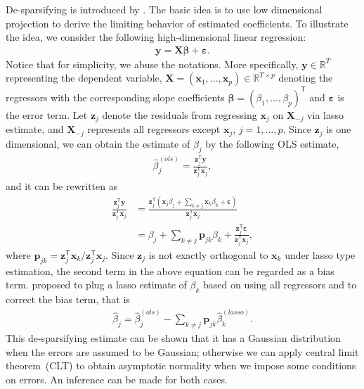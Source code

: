 \documentclass[11pt,a4paper]{article}
\newcommand{\Bveps}{\boldsymbol{\varepsilon}}
\newcommand{\Bbeta}{\boldsymbol{\beta}}
\newcommand{\MBp}{\mathbf{p}}
\newcommand{\MBX}{\mathbf{X}}
\newcommand{\MBx}{\mathbf{x}}
\newcommand{\MBy}{\mathbf{y}}
\newcommand{\MBz}{\mathbf{z}}
\newcommand{\tp}{\mathsf{T}}
\theoremstyle{definition}
\begin{document}
De-sparsifying is introduced by \citet{Zhang2014}. The basic idea is to use low dimensional projection to derive the limiting behavior of estimated coefficients. To illustrate the idea, we consider the following high-dimensional linear regression:
\begin{align*}
\MBy=\MBX\Bbeta+\Bveps.
\end{align*}
Notice that for simplicity, we abuse the notations. More specifically, $\MBy\in\mathbb{R}^{T}$ representing the dependent variable, $\MBX=(\MBx_1,...,\MBx_p)\in\mathbb{R}^{T\times p}$ denoting the regressors with the corresponding slope coefficients $\Bbeta=(\beta_1,...,\beta_p)^{\tp}$ and $\Bveps$ is the error term. Let $\MBz_{j}$ denote the residuals from regressing $\MBx_{j}$ on $\MBX_{-j}$ via lasso estimate, and $\MBX_{-j}$ represents all regressors except $\MBx_{j}$, $j=1,...,p$. Since $\MBz_{j}$ is one dimensional, we can obtain the estimate of $\beta_{j}$ by the following OLS estimate,
\begin{align*}
\hat\beta_{j}^{(ols)}=\frac{\MBz_{j}^{\tp}\MBy}{\MBz_{j}^{\tp}\MBx_{j}},
\end{align*}
and it can be rewritten as 
\begin{align*}
\frac{\MBz_{j}^{\tp}\MBy}{\MBz_{j}^{\tp}\MBx_{j}}&=\frac{\MBz_{j}^{\tp}\left(\MBx_j\beta_j+\sum_{k\neq j}\MBx_{k}\beta_k+\Bveps\right)}{\MBz_{j}^{\tp}\MBx_{j}}\\
&=\beta_j+\sum_{k\neq j}\MBp_{jk}\beta_k+\frac{\MBz_{j}^{\tp}\Bveps}{\MBz_{j}^{\tp}\MBx_{j}},
\end{align*}
where $\MBp_{jk}=\MBz_{j}^{\tp}\MBx_{k}/\MBz_{j}^{\tp}\MBx_{j}$. Since $\MBz_{j}$ is not exactly orthogonal to $ \MBx_{k}$ under lasso type estimation, the second term in the above equation can be regarded as a bias term.  \citet{Zhang2014} proposed to plug a lasso estimate of $\beta_k$ based on using all regressors and to correct the bias term, that is 
\begin{align*}
\hat\beta_{j}=\hat\beta_{j}^{(ols)}-\sum_{k\neq j}\MBp_{jk}\hat\beta_k^{(lasso)}.
\end{align*}
This de-sparsifying estimate can be shown that it has a Gaussian distribution when the errors are assumed to be Gaussian; otherwise we can apply central limit theorem~(CLT) to obtain asymptotic normality when we impose some conditions on errors. An inference can be made for both cases.
\end{document}
